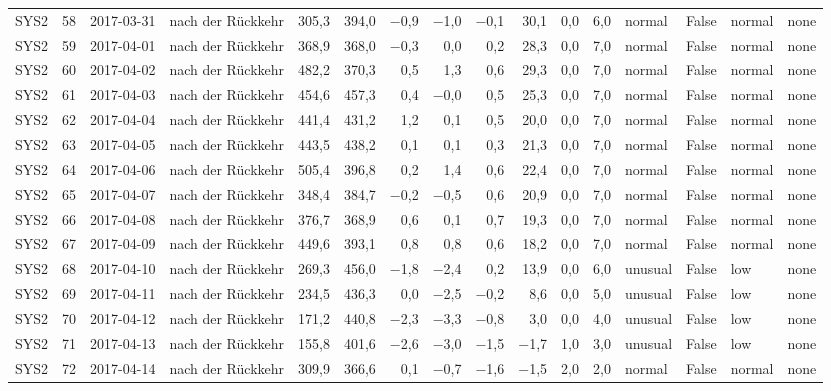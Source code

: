 \begin{tabular}{lrllrrrrrrrrlrll}
SYS2 & 58 & 2017-03-31 & nach der Rückkehr & 305,3 & 394,0 & $-$0,9 & $-$1,0 & $-$0,1 & 30,1 & 0,0 & 6,0 & normal & False & normal & none \\
SYS2 & 59 & 2017-04-01 & nach der Rückkehr & 368,9 & 368,0 & $-$0,3 & 0,0 & 0,2 & 28,3 & 0,0 & 7,0 & normal & False & normal & none \\
SYS2 & 60 & 2017-04-02 & nach der Rückkehr & 482,2 & 370,3 & 0,5 & 1,3 & 0,6 & 29,3 & 0,0 & 7,0 & normal & False & normal & none \\
SYS2 & 61 & 2017-04-03 & nach der Rückkehr & 454,6 & 457,3 & 0,4 & $-$0,0 & 0,5 & 25,3 & 0,0 & 7,0 & normal & False & normal & none \\
SYS2 & 62 & 2017-04-04 & nach der Rückkehr & 441,4 & 431,2 & 1,2 & 0,1 & 0,5 & 20,0 & 0,0 & 7,0 & normal & False & normal & none \\
SYS2 & 63 & 2017-04-05 & nach der Rückkehr & 443,5 & 438,2 & 0,1 & 0,1 & 0,3 & 21,3 & 0,0 & 7,0 & normal & False & normal & none \\
SYS2 & 64 & 2017-04-06 & nach der Rückkehr & 505,4 & 396,8 & 0,2 & 1,4 & 0,6 & 22,4 & 0,0 & 7,0 & normal & False & normal & none \\
SYS2 & 65 & 2017-04-07 & nach der Rückkehr & 348,4 & 384,7 & $-$0,2 & $-$0,5 & 0,6 & 20,9 & 0,0 & 7,0 & normal & False & normal & none \\
SYS2 & 66 & 2017-04-08 & nach der Rückkehr & 376,7 & 368,9 & 0,6 & 0,1 & 0,7 & 19,3 & 0,0 & 7,0 & normal & False & normal & none \\
SYS2 & 67 & 2017-04-09 & nach der Rückkehr & 449,6 & 393,1 & 0,8 & 0,8 & 0,6 & 18,2 & 0,0 & 7,0 & normal & False & normal & none \\
SYS2 & 68 & 2017-04-10 & nach der Rückkehr & 269,3 & 456,0 & $-$1,8 & $-$2,4 & 0,2 & 13,9 & 0,0 & 6,0 & unusual & False & low & none \\
SYS2 & 69 & 2017-04-11 & nach der Rückkehr & 234,5 & 436,3 & 0,0 & $-$2,5 & $-$0,2 & 8,6 & 0,0 & 5,0 & unusual & False & low & none \\
SYS2 & 70 & 2017-04-12 & nach der Rückkehr & 171,2 & 440,8 & $-$2,3 & $-$3,3 & $-$0,8 & 3,0 & 0,0 & 4,0 & unusual & False & low & none \\
SYS2 & 71 & 2017-04-13 & nach der Rückkehr & 155,8 & 401,6 & $-$2,6 & $-$3,0 & $-$1,5 & $-$1,7 & 1,0 & 3,0 & unusual & False & low & none \\
SYS2 & 72 & 2017-04-14 & nach der Rückkehr & 309,9 & 366,6 & 0,1 & $-$0,7 & $-$1,6 & $-$1,5 & 2,0 & 2,0 & normal & False & normal & none \\

\end{tabular}
